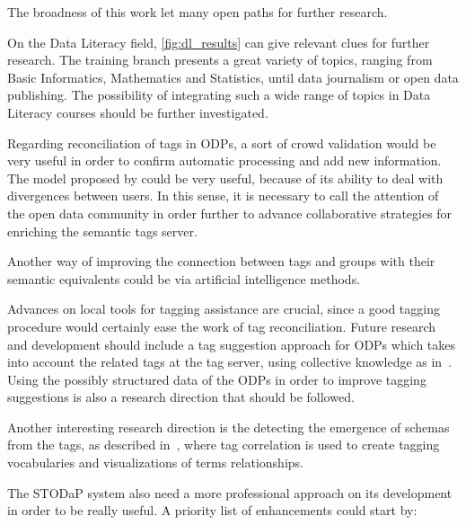 The broadness of this work let many open paths for further research.

On the Data Literacy field, \autoref{fig:dl_results} can give relevant clues for further research.
The training branch presents a great variety of topics, ranging from Basic Informatics, Mathematics and Statistics, until data journalism or open data publishing.
The possibility of integrating such a wide range of topics in Data Literacy courses should be further investigated.

Regarding reconciliation of tags in ODPs, a sort of crowd validation would be very useful in order to confirm automatic processing and add new information.
The model proposed by  could be very useful, because of its ability to deal with divergences between users.
In this sense, it is necessary to call the attention of the open data community in order further to advance collaborative strategies for enriching the semantic tags server.

Another way of improving the connection between tags and groups with their semantic equivalents could be via artificial intelligence methods. 

Advances on local tools for tagging assistance are crucial, since a good tagging procedure would certainly ease the work of tag reconciliation. 
Future research and development should include a tag suggestion approach for ODPs which takes into account the related tags at the tag server, using collective knowledge as in~.
Using the possibly structured data of the ODPs in order to improve tagging suggestions is also a research direction that should be followed.

Another interesting research direction is the detecting the emergence of schemas from the tags, as described in~, where tag correlation is used to create tagging vocabularies and visualizations of terms relationships.

The STODaP system also need a more professional approach on its development in order to be really useful. A priority list of enhancements could start by: 


